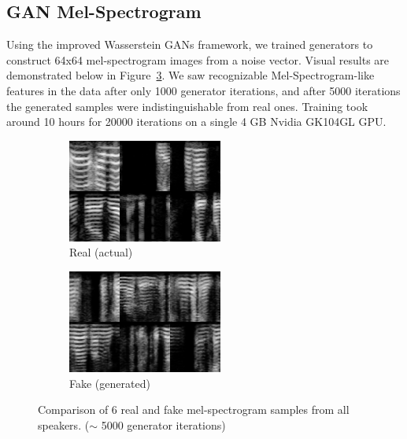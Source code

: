 \subsection{GAN Mel-Spectrogram}
Using the improved Wasserstein GANs framework, we trained generators to
construct 64x64 mel-spectrogram images from a noise vector. Visual results are demonstrated below in Figure~\ref{fig:samples_comparison}.   We saw recognizable Mel-Spectrogram-like features in the
data after only 1000 generator iterations, and after 5000 iterations the generated samples were indistinguishable from real ones. Training took around 10
hours for 20000 iterations on a single 4 GB Nvidia GK104GL GPU.
%
\begin{figure}[!t]
    \centering
    \begin{subfigure}[t]{0.3\columnwidth}
        \centering
        \includegraphics[width=\columnwidth]{figures/samples_groundtruth.png}
        \caption{Real (actual)}
        \label{fig:samples_real}
    \end{subfigure}
    \qquad
    \begin{subfigure}[t]{0.3\columnwidth}
        \centering
        \includegraphics[width=\columnwidth]{figures/samples_5419.png}
        \caption{Fake (generated)}
        \label{fig:samples_fake}
    \end{subfigure}
    \caption{Comparison of 6 real and fake mel-spectrogram samples from all speakers. ($\sim$ 5000 generator iterations) }
    \label{fig:samples_comparison}
\end{figure}

